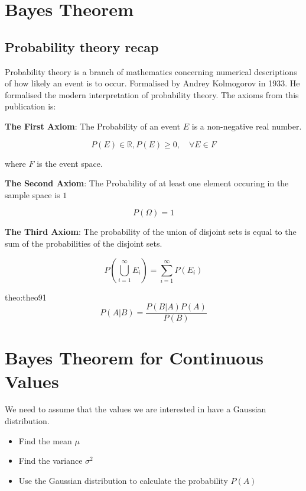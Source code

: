 \section{Bayes Theorem}

\subsection{Probability theory recap}
Probability theory is a branch of mathematics concerning numerical descriptions
of how likely an event is to occur. Formalised by Andrey Kolmogorov in 1933.
\cite{kolmogorov2018foundations} He formalised the modern interpretation of 
probability theory. The axioms from this publication is:

\medskip

\textbf{The First Axiom}: The Probability of an event $E$ is a non-negative real
number.

\begin{equation}
    P(E) \in \mathbb{R}, P(E) \geq 0, \quad \forall E \in F 
\end{equation}

where $F$ is the event space.

\medskip

\textbf{The Second Axiom}: The Probability of at least one element occuring in
the sample space is $1$

\begin{equation}
    P(\Omega) = 1
\end{equation}

\medskip

\textbf{The Third Axiom}: The probability of the union of disjoint sets is equal
to the sum of the probabilities of the disjoint sets.

\begin{equation}
    P\left(\bigcup_{i = 1}^{\infty} E_i \right) = \sum_{i = 1}^{\infty} P(E_i)
\end{equation}

\begin{theo}[]{theo:theo91}
\label{eq:bayes}
\[
P(A|B) = \frac{P(B|A) P(A)}{P(B)}
\]
\end{theo}

\section{Bayes Theorem for Continuous Values}

We need to assume that the values we are interested in have a Gaussian distribution.
\begin{itemize}
    \item Find the mean $\mu$
    \item Find the variance $\sigma^2$
    \item Use the Gaussian distribution to calculate the probability $P(A)$
\end{itemize}
\medskip

